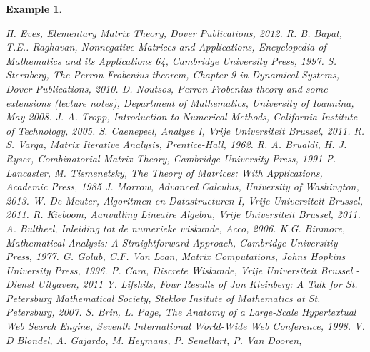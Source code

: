 \documentclass[a4paper,11pt]{report}
\newtheorem{example}[theorem]{Example}
\begin{document}
\begin{example}
   \newpage
\begin{thebibliography}{99}
 H. Eves, \emph{Elementary Matrix Theory}, Dover Publications, 
2012.
\bibitem[BAPAT] R. B. Bapat, T.E.. Raghavan, \emph{Nonnegative Matrices and 
Applications}, Encyclopedia of Mathematics and its Applications 64, Cambridge University Press, 1997. 
 S. Sternberg, \emph{The Perron-Frobenius theorem}, Chapter 9 in Dynamical Systems, Dover Publications, 2010.
 D. Noutsos, \emph{Perron-Frobenius theory and some extensions} (lecture notes), Department of Mathematics, University of Ioannina, May 2008.
 J. A. Tropp, \emph{Introduction to Numerical Methods}, California Institute of 
Technology, 2005.
 S. Caenepeel, \emph{Analyse I}, Vrije Universiteit Brussel, 2011.
\bibitem[VARGA] R. S. Varga, \emph{Matrix Iterative Analysis}, Prentice-Hall, 1962. 
\bibitem[BRUALDI] R. A. Brualdi, H. J. Ryser, \emph{Combinatorial Matrix Theory}, Cambridge University 
Press, 1991
\bibitem[LANCASTER] P. Lancaster, M. Tismenetsky, \emph{The Theory of Matrices: With 
Applications}, Academic Press, 1985
\bibitem[MORROW] J. Morrow, \emph{Advanced Calculus}, University of Washington, 
2013.
 W. De Meuter, \emph{Algoritmen en Datastructuren I}, Vrije Universiteit Brussel, 2011.
 R. Kieboom, \emph{Aanvulling Lineaire Algebra}, Vrije Universiteit Brussel, 2011.
 A. Bultheel, \emph{Inleiding tot de numerieke wiskunde}, Acco, 
2006.
 K.G. Binmore, \emph{Mathematical Analysis: A Straightforward Approach}, Cambridge Universitiy Press, 1977.
 G. Golub, C.F. Van Loan, \emph{Matrix Computations}, 
Johns Hopkins University Press, 1996.
 P. Cara, \emph{Discrete Wiskunde}, Vrije Universiteit Brussel - Dienst 
Uitgaven, 2011
 Y. Lifshits, \emph{Four Results of Jon Kleinberg: A Talk for St. Petersburg Mathematical 
Society}, Steklov Insitute of Mathematics at St. Petersburg, 2007.
 S. Brin, L. Page, \emph{The Anatomy of a Large-Scale Hypertextual Web Search Engine}, Seventh International World-Wide Web Conference, 1998.
 V. D Blondel, A. Gajardo, M. Heymans, P. Senellart, P. Van Dooren, 

\end{thebibliography}
\end{example}
\end{document}
